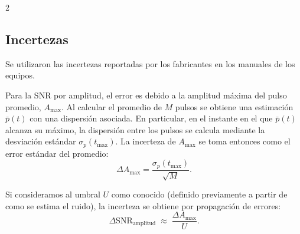 \documentclass[11pt,letterpaper]{article}
\begin{document}
\begin{multicols*}{2}







\vspace{-3mm}
\subsection*{Incertezas}
\vspace{-2mm}
Se utilizaron las incertezas reportadas por los fabricantes en los manuales de los equipos.

Para la SNR por amplitud, el error es debido a la amplitud máxima del pulso promedio, \(A_{\max}\). 
Al calcular el promedio de \(M\) pulsos se obtiene una estimación \(\bar p(t)\) 
con una dispersión asociada. En particular, en el instante en el que \(\bar p(t)\) alcanza su máximo, la dispersión entre los pulsos 
se calcula mediante la desviación estándar \(\sigma_p(t_{\max})\). 
La incerteza de \(A_{\max}\) se toma entonces como el error estándar del promedio:
\begin{equation*}
    \Delta A_{\max} = \frac{\sigma_p(t_{\max})}{\sqrt{M}}.
\end{equation*}

Si consideramos al umbral \(U\) como conocido (definido previamente a partir de como se estima el ruido), la incerteza se obtiene por propagación de errores:
\[
\Delta \mathrm{SNR}_{\text{amplitud}} \;\approx\; \frac{\Delta A_{\max}}{U}.
\]


\end{multicols*}
\end{document}
